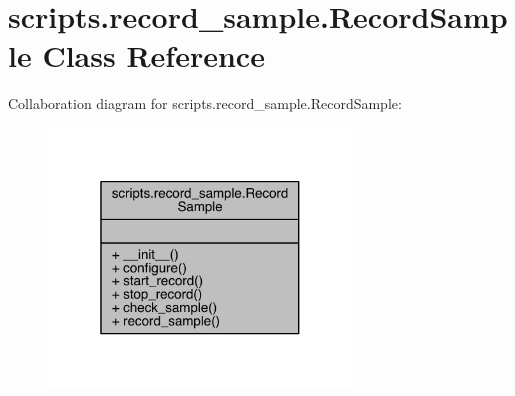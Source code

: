 \hypertarget{classscripts_1_1record__sample_1_1_record_sample}{}\section{scripts.\+record\+\_\+sample.\+Record\+Sample Class Reference}
\label{classscripts_1_1record__sample_1_1_record_sample}


Collaboration diagram for scripts.\+record\+\_\+sample.\+Record\+Sample\+:\nopagebreak
\begin{figure}[H]
\begin{center}
\leavevmode
\includegraphics[width=229pt]{classscripts_1_1record__sample_1_1_record_sample__coll__graph}
\end{center}
\end{figure}

